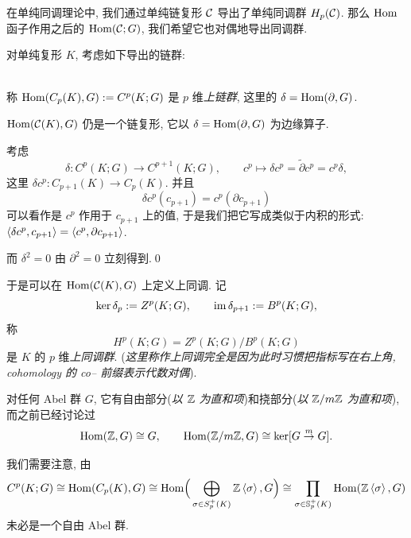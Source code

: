 在单纯同调理论中, 我们通过单纯链复形 $ \mathcal{C} $ 导出了单纯同调群 $ H_p(\mathcal{C}) $. 那么 $ \mathrm{Hom} $ 函子作用之后的 $ \mathrm{Hom}(\mathcal{C};G) $, 我们希望它也对偶地导出同调群.

对单纯复形 $ K $, 考虑如下导出的链群:
\begin{center}
\end{center}~\\
称 $ \mathrm{Hom}(C_p(K),G):=C^p(K;G) $ 是 $ p $ 维\emph{上链群}, 这里的 $ \delta=\mathrm{Hom}(\partial,G) $.

\begin{Proposition}
	$ \mathrm{Hom}(\mathcal{C}(K),G) $ 仍是一个链复形, 它以 $ \delta=\mathrm{Hom}(\partial,G) $ 为边缘算子.
\end{Proposition}
\begin{Proof}
	考虑
	\[
		\delta : C^p(K;G)\to C^{p+1}(K;G),\qquad c^p\mapsto\delta c^p=\tilde{\partial}c^p=c^p\delta,
	\]
	这里 $ \delta c^p : C_{p+1}(K)\to C_p(K) $. 并且
	\[
		\delta c^p(c_{p+1})=c^p(\partial c_{p+1})
	\]
	可以看作是 $ c^p $ 作用于 $ c_{p+1} $ 上的值, 于是我们把它写成类似于内积的形式: $ \left\langle \delta c^p,c_{p+1} \right\rangle=\left\langle c^p,\partial c_{p+1} \right\rangle $.
	
	而 $ \delta^2=0 $ 由 $ \partial^2=0 $ 立刻得到.\qed
\end{Proof}

于是可以在 $ \mathrm{Hom}(\mathcal{C}(K),G) $ 上定义上同调. 记
\[
	\ker\delta_p:=Z^p(K;G),\qquad \mathrm{im}\,\delta_{p+1}:=B^p(K;G),
\]
称
\[
	H^p(K;G)=Z^p(K;G)/B^p(K;G)
\]
是 $ K $ 的 $ p $ 维\emph{上同调群}. (\textit{这里称作上同调完全是因为此时习惯把指标写在右上角, cohomology 的 co-- 前缀表示代数对偶}).

对任何 Abel 群 $ G $, 它有自由部分(\textit{以 $ \mathbb{Z} $ 为直和项})和挠部分(\textit{以 $ \mathbb{Z}/m\mathbb{Z} $ 为直和项}), 而之前已经讨论过
\[
	\mathrm{Hom}(\mathbb{Z},G)\cong G,\qquad \mathrm{Hom}(\mathbb{Z}/m\mathbb{Z},G)\cong\ker[G\stackrel{m}{\to}G].
\]

我们需要注意, 由
\[
	C^p(K;G)\cong\mathrm{Hom}(C_p(K),G)\cong\mathrm{Hom}\Big( \bigoplus_{\sigma\in S_p^+(K)}\mathbb{Z}\left\langle \sigma \right\rangle,G \Big)\cong\prod_{\sigma\in\mathbb{S}_p^+(K)}\mathrm{Hom}(\mathbb{Z}\left\langle \sigma \right\rangle,G)
\]
未必是一个自由 Abel 群.

